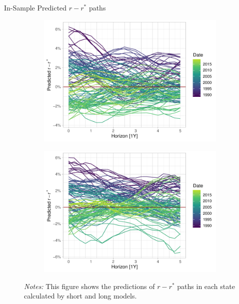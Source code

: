 \documentclass[10pt,aspectratio=169]{beamer}
\begin{document}
\begin{frame}{In-Sample Predicted $r-r^*$ paths}
    \begin{figure}[!htbp]\centering
        \begin{minipage}{\textwidth}
            \caption{}
            \label{fig:predicted_paths}
            \begin{subfigure}[b]{0.49\textwidth}
                \includegraphics[width=\linewidth]{predicted_paths_short.pdf}
            \end{subfigure}%
            \begin{subfigure}[b]{0.49\textwidth}
          \includegraphics[width=\linewidth]{predicted_paths_long.pdf}
        \end{subfigure}
          {\begin{flushleft}\tiny \textit{Notes:} This figure shows the predictions of $r-r^*$ paths in each state calculated by short and long models.\end{flushleft}} 
          \end{minipage}
      \end{figure}
\end{frame}
\end{document}
